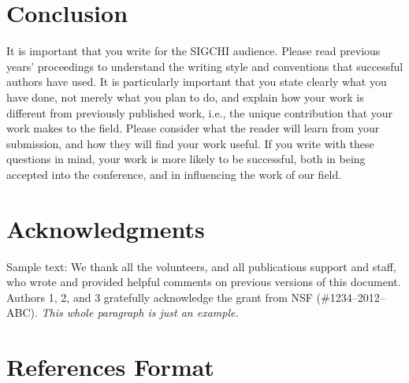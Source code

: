 \documentclass[chi_draft]{sigchi}
\begin{document}
\section{Conclusion}

It is important that you write for the SIGCHI audience. Please read
previous years' proceedings to understand the writing style and
conventions that successful authors have used. It is particularly
important that you state clearly what you have done, not merely what
you plan to do, and explain how your work is different from previously
published work, i.e., the unique contribution that your work makes to
the field. Please consider what the reader will learn from your
submission, and how they will find your work useful. If you write with
these questions in mind, your work is more likely to be successful,
both in being accepted into the conference, and in influencing the
work of our field.

\section{Acknowledgments}

Sample text: We thank all the volunteers, and all publications support
and staff, who wrote and provided helpful comments on previous
versions of this document. Authors 1, 2, and 3 gratefully acknowledge
the grant from NSF (\#1234--2012--ABC). \textit{This whole paragraph is
  just an example.}

%
%
%
%
%
\balance{}

\section{References Format}


\balance{}



\end{document}
